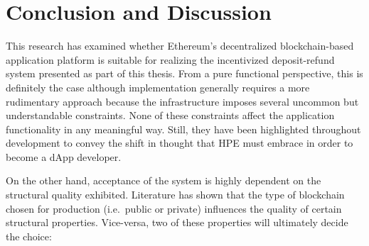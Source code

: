 
\chapter{Conclusion and Discussion}
\label{chp:conclusion}
This research has examined whether Ethereum's decentralized blockchain-based application platform is suitable for realizing the incentivized deposit-refund system presented as part of this thesis. From a pure functional perspective, this is definitely the case although implementation generally requires a more rudimentary approach because the infrastructure imposes several uncommon but understandable constraints. None of these constraints affect the application functionality in any meaningful way. Still, they have been highlighted throughout development to convey the shift in thought that \ac{HPE} must embrace in order to become a \ac{dApp} developer.

On the other hand, acceptance of the system is highly dependent on the structural quality exhibited. Literature has shown that the type of blockchain chosen for production (i.e.~public or private) influences the quality of certain structural properties. Vice-versa, two of these properties will ultimately decide the choice: 


